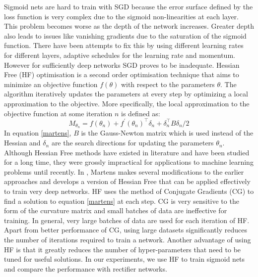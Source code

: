 \documentclass{article}
\begin{document}
Sigmoid nets are hard to train with SGD because the error surface defined by the loss function is very complex due to the sigmoid non-linearities at each layer. This problem becomes worse as the depth of the network increases. Greater depth also leads to issues like vanishing gradients due to the saturation of the sigmoid function. There have been attempts to fix this by using different learning rates for different layers, adaptive schedules for the learning rate and momentum. However for sufficiently deep networks SGD proves to be inadequate. Hessian Free (HF) optimisation is a second order optimisation technique that aims to minimize an objective function $f(\theta)$ with respect to the parameters $\theta$. The algorithm iteratively updates the parameters at every step by optimizing a local approximation to the objective. More specifically, the local approximation to the objective function at some iteration $n$ is defined as:
\begin{equation}
\label{martens}
M_{\theta_n} = f(\theta_n) + f^{\prime}(\theta_n)^{\intercal}\delta_n + \delta_n^{\intercal} B \delta_n / 2 
\end{equation}
In equation \ref{martens}, $B$ is the Gauss-Newton matrix which is used instead of the Hessian and $\delta_{n} $ are the search directions for updating the parameters $\theta_{n}$. Although Hessian Free methods have existed in literature and have been studied for a long time, they were grossly impractical for applications to machine learning problems until recently. In \cite{martens2010deep}, Martens makes several modifications to the earlier approaches and develops a version of Hessian Free that can be applied effectively to train very deep networks. HF uses the method of Conjugate Gradients (CG) to find a solution to equation \ref{martens} at each step. CG is very sensitive to the form of the curvature matrix and small batches of data are ineffective for training. In general, very large batches of data are used for each iteration of HF. Apart from better performance of CG, using large datasets significantly reduces the number of iterations required to train a network. Another advantage of using HF is that it greatly reduces the number of hyper-parameters that need to be tuned for useful solutions. In our experiments, we use HF to train sigmoid nets and compare the performance with rectifier networks. 
\end{document}
